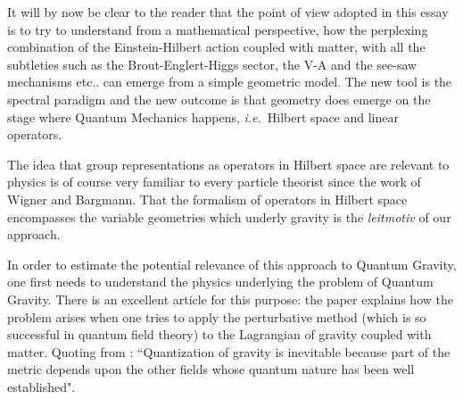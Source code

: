 \documentclass[12pt]{article}
\newcommand{\ie}{{\it i.e.\/}\ }
\begin{document}
It will by now be clear to the reader that the point of view adopted in this essay is to try to understand from a mathematical perspective, how the perplexing combination of the Einstein-Hilbert action coupled with matter, with all the subtleties such as the Brout-Englert-Higgs sector, the V-A and the see-saw mechanisms etc..  can emerge from a simple geometric model. The new tool is the spectral paradigm and the new outcome is that geometry does emerge  on the stage where Quantum Mechanics happens, \ie  Hilbert space and linear operators. 

The idea that group representations as operators in Hilbert space are relevant to physics is of course very familiar to every particle theorist since the work of Wigner and Bargmann. That the formalism of operators in Hilbert space encompasses the variable geometries which underly gravity is the {\em leitmotiv} of our approach.

 In order to estimate the potential relevance of this approach to Quantum Gravity, one first needs to understand the physics underlying the problem of Quantum Gravity. There is an excellent article for this purpose: the paper \cite{woodard} explains how the problem arises when one tries to apply the perturbative method (which is so successful in quantum field theory) to the Lagrangian of gravity coupled with matter. Quoting from \cite{woodard}: ``Quantization of gravity is inevitable because part of the metric depends upon the other fields whose quantum nature has been well established".
 
\end{document}
